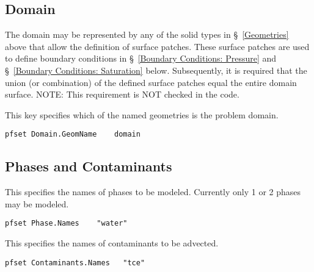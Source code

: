 
\subsection{Domain}
\label{Domain}

The domain may be represented by any of the solid types in
\S~\ref{Geometries} above that allow the definition of surface patches.
These surface patches are used to define boundary conditions in
\S~\ref{Boundary Conditions: Pressure} and
\S~\ref{Boundary Conditions: Saturation} below.
Subsequently, it is required that the union (or combination) of the defined surface
patches equal the entire domain surface.  NOTE: This requirement is NOT checked
in the code.

{
This key specifies which of the named geometries is the problem domain.
}
\begin{display}\begin{verbatim}
pfset Domain.GeomName    domain
\end{verbatim}\end{display}


\subsection{Phases and Contaminants}
\label{Phases and Contaminants}

{This specifies the names of phases to be modeled. 
Currently only 1 or 2 phases may be modeled.}
\begin{display}\begin{verbatim}
pfset Phase.Names    "water"
\end{verbatim}\end{display}

{This specifies the names of contaminants to be advected.}
\begin{display}\begin{verbatim}
pfset Contaminants.Names   "tce"
\end{verbatim}\end{display}

